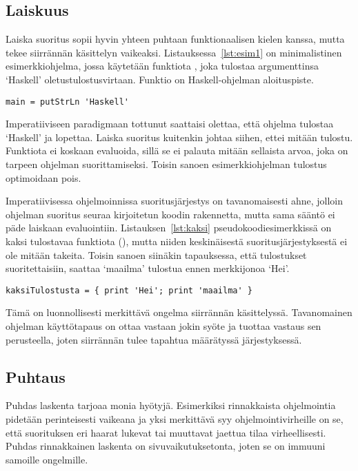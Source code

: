 \documentclass[finnish]{tktltiki2}
\begin{document}
\subsection{Laiskuus}

Laiska suoritus sopii hyvin yhteen puhtaan funktionaalisen kielen kanssa, mutta tekee siirrännän
käsittelyn vaikeaksi. Listauksessa~\ref{lst:esim1} on minimalistinen esimerkkiohjelma, jossa käytetään
funktiota , joka tulostaa argumenttinsa `Haskell' oletustulostusvirtaan. Funktio
 on Haskell-ohjelman aloituspiste.

\begin{lstlisting}[label={lst:esim1},caption={Tulostava esimerkkiohjelma}]
main = putStrLn 'Haskell'
\end{lstlisting}

Imperatiiviseen paradigmaan tottunut saattaisi olettaa, että ohjelma tulostaa `Haskell' ja lopettaa.
Laiska suoritus kuitenkin johtaa siihen, ettei mitään tulostu. Funktiota  ei koskaan
evaluoida, sillä se ei palauta mitään sellaista arvoa, joka on tarpeen ohjelman suorittamiseksi.
Toisin sanoen esimerkkiohjelman tulostus optimoidaan pois.

Imperatiivisessa ohjelmoinnissa suoritusjärjestys on tavanomaisesti ahne, jolloin ohjelman suoritus
seuraa kirjoitetun koodin rakennetta, mutta sama sääntö ei päde laiskaan evaluointiin.
Listauksen~\ref{lst:kaksi} pseudokoodiesimerkkissä on kaksi tulostavaa funktiota (),
mutta niiden keskinäisestä suoritusjärjestyksestä ei ole mitään takeita. Toisin sanoen siinäkin
tapauksessa, että tulostukset suoritettaisiin, saattaa `maailma' tulostua ennen merkkijonoa `Hei'.

\begin{lstlisting}[label={lst:kaksi},caption={Kahden tulostuksen pseudokoodi}]
kaksiTulostusta = { print 'Hei'; print 'maailma' }
\end{lstlisting}

Tämä on luonnollisesti merkittävä ongelma siirrännän käsittelyssä. Tavanomainen ohjelman
käyttötapaus on ottaa vastaan jokin syöte ja tuottaa vastaus sen perusteella, joten siirrännän tulee
tapahtua määrätyssä järjestyksessä.

\subsection{Puhtaus}

Puhdas laskenta tarjoaa monia hyötyjä. Esimerkiksi rinnakkaista ohjelmointia pidetään perinteisesti
vaikeana ja yksi merkittävä syy ohjelmointivirheille on se, että suorituksen eri haarat lukevat tai
muuttavat jaettua tilaa virheellisesti. Puhdas rinnakkainen laskenta on sivuvaikutuksetonta, joten
se on immuuni samoille ongelmille.
\end{document}
